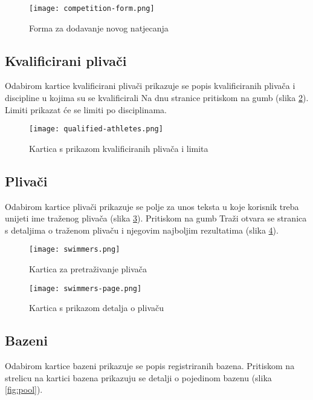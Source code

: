 \documentclass[times, utf8, zavrsni]{fer}
\begin{document}
\begin{figure}[!h]
    \centering
    \texttt{[image: competition-form.png]}
    \centering
    \caption{Forma za dodavanje novog natjecanja}
    \label{fig:competition-form}
\end{figure}

\subsection{Kvalificirani plivači}
Odabirom kartice kvalificirani plivači prikazuje se popis kvalificiranih plivača i discipline u kojima su se kvalificirali
Na dnu stranice pritiskom na gumb (slika \ref{fig:qualified-athletes}). Limiti prikazat će se limiti po disciplinama.

\begin{figure}[!h]
    \centering
    \texttt{[image: qualified-athletes.png]}
    \centering
    \caption{Kartica s prikazom kvalificiranih plivača i limita}
    \label{fig:qualified-athletes}
\end{figure}

\subsection{Plivači}
Odabirom kartice plivači prikazuje se polje za unos teksta u koje korisnik treba unijeti ime traženog plivača (slika \ref{fig:swimmers}).
Pritiskom na gumb Traži otvara se stranica s detaljima o traženom plivaču i njegovim najboljim rezultatima (slika \ref{fig:swimmers-page}).

\begin{figure}[!h]
    \centering
    \texttt{[image: swimmers.png]}
    \centering
    \caption{Kartica za pretraživanje plivača}
    \label{fig:swimmers}
\end{figure}

\begin{figure}[!h]
    \centering
    \texttt{[image: swimmers-page.png]}
    \centering
    \caption{Kartica s prikazom detalja o plivaču}
    \label{fig:swimmers-page}
\end{figure}

\subsection{Bazeni}
Odabirom kartice bazeni prikazuje se popis registriranih bazena. Pritiskom na strelicu na kartici bazena prikazuju se detalji o pojedinom bazenu (slika \ref*{fig:pool}).
\end{document}
